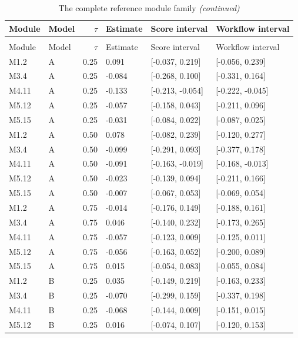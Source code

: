 
\begin{longtable}[t]{llrlll}
\caption{\label{tab:joint-modules}The complete reference module family}\\
\toprule
Module & Model & $\tau$ & Estimate & Score interval & Workflow interval\\
\midrule
\endfirsthead
\caption[]{The complete reference module family \textit{(continued)}}\\
\toprule
Module & Model & $\tau$ & Estimate & Score interval & Workflow interval\\
\midrule
\endhead

\endfoot
\bottomrule
\endlastfoot
M1.2 & A & 0.25 & 0.091 & {}[-0.037, 0.219] & {}[-0.056, 0.239]\\
M3.4 & A & 0.25 & -0.084 & {}[-0.268, 0.100] & {}[-0.331, 0.164]\\
M4.11 & A & 0.25 & -0.133 & {}[-0.213, -0.054] & {}[-0.222, -0.045]\\
M5.12 & A & 0.25 & -0.057 & {}[-0.158, 0.043] & {}[-0.211, 0.096]\\
M5.15 & A & 0.25 & -0.031 & {}[-0.084, 0.022] & {}[-0.087, 0.025]\\
M1.2 & A & 0.50 & 0.078 & {}[-0.082, 0.239] & {}[-0.120, 0.277]\\
M3.4 & A & 0.50 & -0.099 & {}[-0.291, 0.093] & {}[-0.377, 0.178]\\
M4.11 & A & 0.50 & -0.091 & {}[-0.163, -0.019] & {}[-0.168, -0.013]\\
M5.12 & A & 0.50 & -0.023 & {}[-0.139, 0.094] & {}[-0.211, 0.166]\\
M5.15 & A & 0.50 & -0.007 & {}[-0.067, 0.053] & {}[-0.069, 0.054]\\
M1.2 & A & 0.75 & -0.014 & {}[-0.176, 0.149] & {}[-0.188, 0.161]\\
M3.4 & A & 0.75 & 0.046 & {}[-0.140, 0.232] & {}[-0.173, 0.265]\\
M4.11 & A & 0.75 & -0.057 & {}[-0.123, 0.009] & {}[-0.125, 0.011]\\
M5.12 & A & 0.75 & -0.056 & {}[-0.163, 0.052] & {}[-0.200, 0.089]\\
M5.15 & A & 0.75 & 0.015 & {}[-0.054, 0.083] & {}[-0.055, 0.084]\\
M1.2 & B & 0.25 & 0.035 & {}[-0.149, 0.219] & {}[-0.163, 0.233]\\
M3.4 & B & 0.25 & -0.070 & {}[-0.299, 0.159] & {}[-0.337, 0.198]\\
M4.11 & B & 0.25 & -0.068 & {}[-0.144, 0.009] & {}[-0.151, 0.015]\\
M5.12 & B & 0.25 & 0.016 & {}[-0.074, 0.107] & {}[-0.120, 0.153]\\

\end{longtable}
